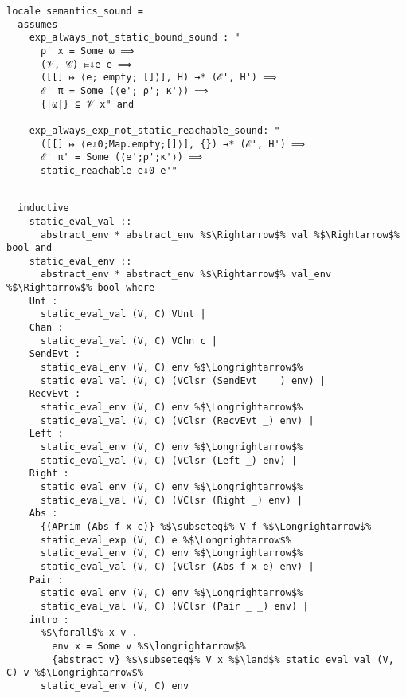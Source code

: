 \documentclass{article}
\begin{document}
\begin{lstlisting}[style=codestyle1, escapechar=\%]
locale semantics_sound =
  assumes
    exp_always_not_static_bound_sound : "
      ρ' x = Some ω ⟹
      (𝒱, 𝒞) ⊨⇩e e ⟹
      ([[] ↦ ⟨e; empty; []⟩], H) →* (ℰ', H') ⟹
      ℰ' π = Some (⟨e'; ρ'; κ'⟩) ⟹
      {|ω|} ⊆ 𝒱 x" and

    exp_always_exp_not_static_reachable_sound: "
      ([[] ↦ ⟨e⇩0;Map.empty;[]⟩], {}) →* (ℰ', H') ⟹
      ℰ' π' = Some (⟨e';ρ';κ'⟩) ⟹
      static_reachable e⇩0 e'"
  \end{lstlisting}


\begin{lstlisting}[style=codestyle1, escapechar=\%]

  inductive 
    static_eval_val ::
      abstract_env * abstract_env %$\Rightarrow$% val %$\Rightarrow$% bool and  
    static_eval_env ::
      abstract_env * abstract_env %$\Rightarrow$% val_env %$\Rightarrow$% bool where
    Unt :
      static_eval_val (V, C) VUnt |
    Chan :
      static_eval_val (V, C) VChn c |
    SendEvt :
      static_eval_env (V, C) env %$\Longrightarrow$%
      static_eval_val (V, C) (VClsr (SendEvt _ _) env) |
    RecvEvt :
      static_eval_env (V, C) env %$\Longrightarrow$%
      static_eval_val (V, C) (VClsr (RecvEvt _) env) |
    Left :
      static_eval_env (V, C) env %$\Longrightarrow$%
      static_eval_val (V, C) (VClsr (Left _) env) |
    Right :
      static_eval_env (V, C) env %$\Longrightarrow$%
      static_eval_val (V, C) (VClsr (Right _) env) |
    Abs :
      {(APrim (Abs f x e)} %$\subseteq$% V f %$\Longrightarrow$% 
      static_eval_exp (V, C) e %$\Longrightarrow$% 
      static_eval_env (V, C) env %$\Longrightarrow$%
      static_eval_val (V, C) (VClsr (Abs f x e) env) |
    Pair :
      static_eval_env (V, C) env %$\Longrightarrow$%
      static_eval_val (V, C) (VClsr (Pair _ _) env) |
    intro :  
      %$\forall$% x v .
        env x = Some v %$\longrightarrow$%
        {abstract v} %$\subseteq$% V x %$\land$% static_eval_val (V, C) v %$\Longrightarrow$%
      static_eval_env (V, C) env

  \end{lstlisting}
\end{document}
